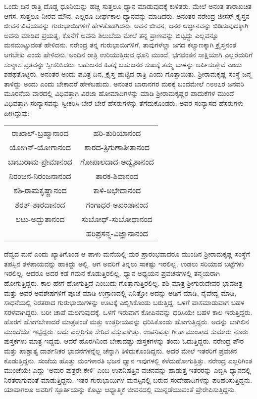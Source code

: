 ಒಂದು ದಿನ ರಾತ್ರಿ ದೊಡ್ಡ ಧೂನಿಯನ್ನು ಹಚ್ಚಿ ಸುತ್ತಲೂ ಧ್ಯಾನ ಮಾಡುವುದಕ್ಕೆ ಕುಳಿತರು. ಮೇಲೆ ಅನಂತ ತಾರಾಖಚಿತ ಆಗಸ. ಸುತ್ತಲೂ ನೀರವ ಮೌನ. ಎಲ್ಲರೂ ದೀರ್ಘಕಾಲ ಧ್ಯಾನವನ್ನು ಮಾಡಿದರು. ಅನಂತರ ನರೇಂದ್ರ ಜೀಸಸ್ ಕ್ರೈಸ್ತನ ಜೀವನ ವಿಷಯವನ್ನು ಗುರುಭಾಯಿಗಳಿಗೆ ಹೇಳತೊಡಗಿದನು. ಅವನ ಜೀವನ, ಜನರ ಅಜ್ಞಾನವನ್ನು ಬಿಡಿಸುವುದಕ್ಕಾಗಿ ಅವನು ಮಾಡಿದ ಪ್ರಯತ್ನ, ಕೊನೆಗೆ ಅವನು ಶಿಲುಬೆಯ ಮೇಲೆ ತನ್ನ ಪ್ರಾಣವನ್ನು ಬಿಟ್ಟದ್ದು ಎಲ್ಲವನ್ನೂ ಮನಮುಟ್ಟುವಂತೆ ಹೇಳಿದನು. ನರೇಂದ್ರ ತನ್ನ ಗುರುಭಾಯಿಗಳಿಗೆ, ತಾವುಗಳೆಲ್ಲಾ ಜಗದ ಕಲ್ಯಾಣಕ್ಕಾಗಿ ಕ್ರೈಸ್ತನಂತೆ ಆಗಬೇಕು ಎಂದು ಹೇಳಿದನು. ಅಂದಿನ ರಾತ್ರಿ ಉರಿಯುತ್ತಿರುವ ಧೂನಿ ಮುಂದೆ, ಭಗವಂತನ ಸಾಕ್ಷಿಯಾಗಿ ಎಲ್ಲರೆದುರಿಗೆ ಸಂನ್ಯಾಸ ವ್ರತವನ್ನು ಸ್ವೀಕರಿಸಿದರು. ಬಹುಜನರ ಹಿತಕ್ಕೆ ಬಹುಜನರ ಸುಖಕ್ಕೆ ತಮ್ಮ ಬಾಳನ್ನು ಅರ್ಪಿಸುತ್ತೇವೆ ಎಂದು ಶಪಥತೊಟ್ಟರು. ಅನಂತರ ಅಂದು ಪವಿತ್ರ ದಿನ, ಕ್ರೈಸ್ತ ಹುಟ್ಟಿದ ರಾತ್ರಿ ಎಂದು ಗೊತ್ತಾಯಿತು. ಶ‍್ರೀರಾಮಕೃಷ್ಣ ಸಂಸ್ಥೆ ಜನ್ಮ ತಾಳಿದ್ದು ಅಂದು ಎಂದು ಬೇಕಾದರೆ ಹೇಳಬಹುದು. ಅನಂತರ ಬಾರಾನಗರ ಮಠಕ್ಕೆ ಬಂದಮೇಲೆ ೧೮೮೭ರ ಜನವರಿ ಮೂರನೆಯ ವಾರದಲ್ಲಿ ವಿಧಿವತ್ತಾಗಿ ವಿರಜಾ ಹೋಮಾದಿಗಳನ್ನು ಮಾಡಿ ಶ‍್ರೀರಾಮಕೃಷ್ಣರ ಪಾದುಕೆಗಳ ಮುಂದೆ ವಿಧಿವತ್ತಾಗಿ ಸಂನ್ಯಾಸವನ್ನು ಸ್ವೀಕರಿಸಿ ಬೇರೆ ಬೇರೆ ಹೆಸರುಗಳನ್ನು ತೆಗೆದುಕೊಂಡರು. ಅವರ ಸಂನ್ಯಾಸದ ಹೆಸರುಗಳು ಹೀಗಿದ್ದುವು:
\begin{center}
\begin{tabular}{cc}
ರಾಖಾಲ್-ಬ್ರಹ್ಮಾನಾಂದ &  ಹರಿ-ತುರಿಯಾನಂದ\\
 ಯೋಗಿನ್-ಯೋಗಾನಂದ &  ಶಾರದ-ತ್ರಿಗುಣಾತೀತಾನಂದ\\
 ಬಾಬುರಾಮ-ಪ್ರೇಮಾನಂದ &  ಗೋಪಾಲದಾದ-ಅದ್ವೈತಾನಂದ\\
 ನಿರಂಜನ-ನಿರಂಜನಾನಂದ &  ತಾರಕ-ಶಿವಾನಂದ\\
 ಶಶಿ-ರಾಮಕೃಷ್ಣಾನಂದ & ಕಾಳಿ-ಅಭೇದಾನಂದ\\
 ಶರತ್-ಶಾರದಾನಂದ &  ಗಂಗಾಧರ-ಅಖಂಡಾನಂದ\\
 ಲಟು-ಅದ್ಭುತಾನಂದ &  ಸುಬೋಧ್-ಸುಬೋಧಾನಂದ\\
              &  ಹರಿಪ್ರಸನ್ನ-ವಿಜ್ಞಾನಾನಂದ
\end{tabular}
\end{center}

ದೆವ್ವದ ಮನೆ ಎಂದು ಖ್ಯಾತಿಗೊಂಡ ಆ ಪಾಳು ಮನೆಯಲ್ಲಿ ಮಠ ಪ್ರಾರಂಭವಾದರೂ ಮುಂದಿನ ಶ‍್ರೀರಾಮಕೃಷ್ಣ ಸಂಸ್ಥೆಗೆ ತಪಸ್ಸಿನ ತಳಪಾಯವನ್ನು ಹಾಕಿದ್ದು ಅಲ್ಲಿ. ಆಗ ಅವರಿಗೆ ತಿನ್ನಲು ಸಾಕಷ್ಟು ಇರಲಿಲ್ಲ. ಉಡಲು ಸರಿಯಾದ ಬಟ್ಟೆಗಳು ಇರಲಿಲ್ಲ. ಆದರೂ ಅದರ ಕಡೆ ಗಮನ ಕೊಡುತ್ತಿರಲಿಲ್ಲ. ಧ್ಯಾನ ಅಧ್ಯಯನ ಪ್ರವಚನಗಳಲ್ಲಿ ತನ್ಮಯರಾಗಿ ಹೋಗುತ್ತಿದ್ದರು. ಕಾಲ ಹೇಗೆ ಹೋಗುತ್ತಿದೆ ಎಂಬುದು ಗೊತ್ತಾಗುತ್ತಿರಲಿಲ್ಲ. ಶಶಿ ಮಾತ್ರ ಶ‍್ರೀಗುರುದೇವರ ಭಾವಚಿತ್ರ ಮತ್ತು ಅವರ ಅವಶೇಷಗಳಿಗೆ ಪೂಜೆ ಮಾಡಿ ಉಗ್ರಾಣದಲ್ಲಿ ಏನಿತ್ತೋ ಅದನ್ನು ಅಡಿಗೆ ಮಾಡಿ, ನೈವೇದ್ಯ ಮಾಡಿ, ಸಾಧನೆಯಲ್ಲಿ ನಿರತರಾದ ಗುರುಭಾಯಿಗಳನ್ನು ಊಟಕ್ಕೆ ಎಬ್ಬಿಸಿಕೊಂಡು ಬರುತ್ತಿದ್ದ. ಒಳಗೆ ವಾಸಮಾಡುವಾಗ ಬಹಳ ಸರಳವಾಗಿದ್ದರು. ಬರೀ ಚಾಪೆ ಮಲಗುವುದಕ್ಕೆ. ಒಳಗೆ ಇರುವಾಗ ಕೋಪಿನವನ್ನು ಧರಿಸಿಯೇ ಬಹಳ ಕಾಲ ಇರುತ್ತಿದ್ದರು. ಹೊರಗೆ ಹೋಗಬೇಕಾದರೆ ಮಾತ್ರಪಂಚೆ ಮತ್ತು ಉತ್ತರೀಯವನ್ನು ಧರಿಸಿಕೊಂಡು ಹೋಗುತ್ತಿದ್ದರು. ಅದನ್ನು ಬಾಗಿಲಿನ ಮುಂದೆಯೇ ಇಟ್ಟಿದ್ದರು. ಅದು ಎಲ್ಲರಿಗೂ ಸೇರಿದ ವಸ್ತುವಾಗಿತ್ತು. ಉಪನಿಷತ್ತು ಗೀತಾ ಮುಂತಾದ ಸುಮಾರು ನೂರು ಪುಸ್ತಕಗಳು ಮಾತ್ರ ಇದ್ದವು. ಆದರೆ ಹೊರಗಿನಿಂದ ಬೇಕಾದಷ್ಟು ಪುಸ್ತಕಗಳನ್ನು ತಂದು ಓದುತ್ತಿದ್ದರು. ನರೇಂದ್ರ ಪೌರ ಮತ್ತು ಪಾಶ್ಚಾತ್ಯ ದಾರ್ಶನಿಕರ ಭಾವನೆಗಳನ್ನೆಲ್ಲ ಚೆನ್ನಾಗಿ ತಿಳಿದುಕೊಂಡಿದ್ದನು. ಅದರ ಮೇಲೆ ಇತರರಿಗೆ ಪ್ರವಚನ ಕೊಡುತ್ತಿದ್ದನು. ಸಂಜೆಯ ಹೊತ್ತು ಮಂಗಳಾರತಿ ಭಜನೆ ಧ್ಯಾನ ಇವುಗಳಲ್ಲಿ ಕಳೆದುಹೋಗುತ್ತಿತ್ತು. ನರೇಂದ್ರ ಎಲ್ಲರಿಗಿಂತ ಮುಂಚೆಯೇ ಎದ್ದು ‘ಅಮರ ಪುತ್ರರೇ ಕೇಳಿ’ ಎಂಬ ಉಪನಿಷತ್ತಿನ ವಚನವನ್ನು ಹಾಡುತ್ತ ಇತರರನ್ನು ಎಬ್ಬಿಸಿ ಧ್ಯಾನದಲ್ಲಿ ನಿರತರಾಗುವಂತೆ ಮಾಡುತ್ತಿದ್ದನು. ಇತರ ಗುರುಭಾಯಿಗಳ ಮನಸ್ಸಿನಲ್ಲಿ ಬರುವ ಸಂದೇಹಾದಿಗಳನ್ನು ಪರಿಹರಿಸುತ್ತಿದ್ದನು. ಯಾವಾಗಲೂ ಅವರಿಗೆ ಸ್ಫೂರ್ತಿಯನ್ನು ಕೊಟ್ಟು ಆಧ್ಯಾತ್ಮಿಕ ಜೀವನದಲ್ಲಿ ಮುನ್ನಡೆಯುವಂತೆ ಪ್ರೇರೇಪಿಸುತ್ತಿದ್ದನು.

